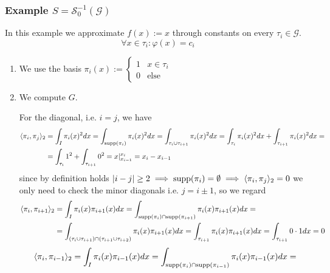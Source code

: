 \subsubsection{Example \(S = \mathcal{S}_0^{-1}(\mathcal{G})\)}
In this example we approximate \(f(x) := x\) through constants on every \(\tau_i \in \mathcal{G}\).
\[\forall x \in \tau_i: \varphi(x) = c_i\]
\begin{enumerate}
   \item We use the basis \(\pi_i(x) := \begin{cases}1 & x \in \tau_i\\ 0 & \text{else}\end{cases}\)
   \item We compute \(G\).

      For the diagonal, i.e. \(i = j\), we have
      \begin{equation*}
         \begin{split}
            \langle \pi_i, \pi_j \rangle_2 & = \int_I \pi_i(x)^2 dx = \int_{\operatorname{supp}(\pi_i)}\pi_i(x)^2 dx = \int_{\tau_i \cup \tau_{i+1}} \pi_i(x)^2 dx = \int_{\tau_i} \pi_i(x)^2 dx + \int_{\tau_{i+1}} \pi_i(x)^2 dx = \\
                                           & = \int_{\tau_i} 1^2 + \int_{\tau_{i+1}} 0^2 = x \rvert_{x_{i-1}}^{x_i} = x_i - x_{i-1}
         \end{split}
      \end{equation*}
      since by definition holds \(|i - j| \geq 2 \implies \operatorname{supp}(\pi_i) = \emptyset \implies \langle\pi_i, \pi_j\rangle_2 = 0\) we only need to check the minor diagonals i.e. \(j = i \pm 1\), so we regard
      \begin{equation*}
         \begin{split}
         \langle \pi_i, \pi_{i+1}\rangle_2 & = \int_I \pi_i(x)\pi_{i+1}(x)dx = \int_{\operatorname{supp}(\pi_i) \cap \operatorname{supp}(\pi_{i+1})} \pi_i(x)\pi_{i+1}(x)dx = \\
                                           & = \int_{(\tau_i \cup \tau_{i+1}) \cap (\tau_{i+1} \cup \tau_{i+2})} \pi_i(x) \pi_{i+1}(x)dx = \int_{\tau_{i+1}} \pi_i(x) \pi_{i+1}(x) dx = \int_{\tau_{i+1}} 0 \cdot 1 dx = 0
         \end{split}
      \end{equation*}
      \begin{equation*}
         \begin{split}
         \langle \pi_i, \pi_{i-1}\rangle_2 & = \int_I \pi_i(x)\pi_{i-1}(x)dx = \int_{\supp(\pi_i) \cap \supp(\pi_{i-1})} \pi_i(x)\pi_{i-1}(x)dx = \\

\end{split}
\end{equation*}
\end{enumerate}
